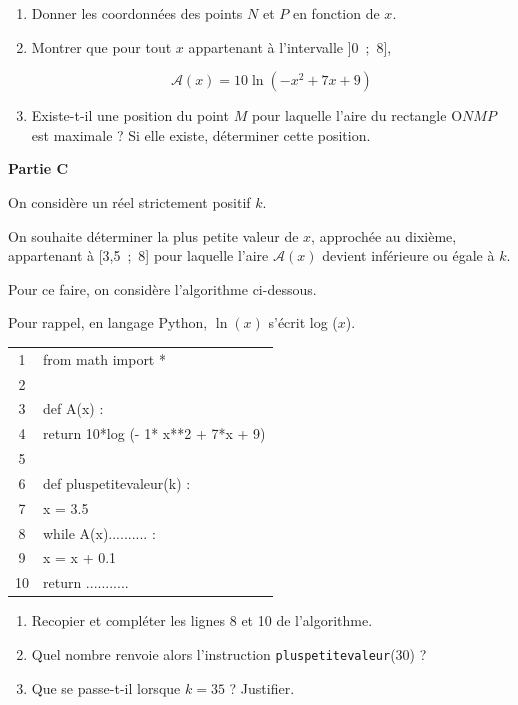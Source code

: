 \documentclass[10pt]{article}
\begin{document}
\begin{enumerate}
\item Donner les coordonnées des points $N$ et $P$ en fonction de $x$.
\item Montrer que pour tout $x$ appartenant à l’intervalle ]0~;~8],

\[\mathcal{A}(x) = 10 \ln \left(-x^2 + 7x + 9\right)\]

\item Existe-t-il une position du point $M$ pour laquelle l’aire du rectangle O$NMP$ est
maximale ? Si elle existe, déterminer cette position.
\end{enumerate}

\medskip

\textbf{Partie C}

\medskip

On considère un réel strictement positif $k$.

On souhaite déterminer la plus petite valeur de $x$, approchée au dixième, appartenant à [3,5~;~8] pour laquelle l’aire $\mathcal{A}(x)$ devient inférieure ou égale à $k$.

Pour ce faire, on considère l’algorithme ci-dessous.

Pour rappel, en langage Python, $\ln (x)$ s’écrit log ($x$).

\begin{center}
\begin{ttfamily}
\begin{tabular}{c l}
1&from math import *\\
2&\\
3&def A(x) :\\
4&\quad return 10*log (- 1* x**2 + 7*x + 9)\\
5&\quad \\
6&def pluspetitevaleur(k) :\\
7&\quad x = 3.5\\
8&\quad while A(x).......... :\\
9& \qquad x = x + 0.1\\
10&\quad return ...........
\end{tabular}
\end{ttfamily}
\end{center}

\smallskip

\begin{enumerate}
\item Recopier et compléter les lignes 8 et 10 de l’algorithme.
\item Quel nombre renvoie alors l’instruction \texttt{pluspetitevaleur}(30) ?
\item Que se passe-t-il lorsque $k = 35$ ? Justifier.
\end{enumerate}

\medskip
\end{document}
